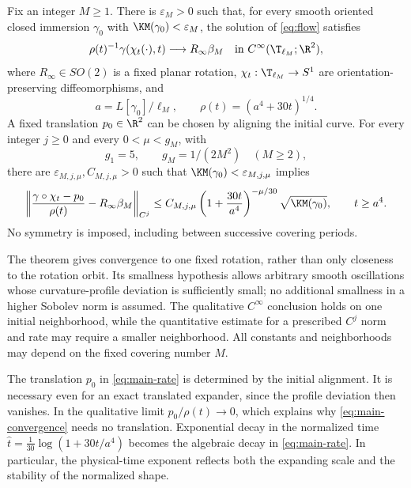 \begin{theorem}\label{thm:main}
Fix an integer $M\ge1$. There is $\varepsilon_M>0$ such that, for every smooth oriented closed immersion $\gamma_0$ with $\KM(\gamma_0)<\varepsilon_M$, the solution of \eqref{eq:flow} satisfies
\begin{equation}\label{eq:main-convergence}
 \rho(t)^{-1}\gamma(\chi_t(\cdot),t)\longrightarrow R_\infty\beta_M
 \quad\text{in }C^\infty(\T_{\ell_M};\R^2),
\end{equation}
where $R_\infty\in SO(2)$ is a fixed planar rotation, $\chi_t:\T_{\ell_M}\to S^1$ are orientation-preserving diffeomorphisms, and
\begin{equation}\label{eq:rho-intro}
 a=L[\gamma_0]/\ell_M,\qquad \rho(t)=(a^4+30t)^{1/4}.
\end{equation}
A fixed translation $p_0\in\R^2$ can be chosen by aligning the initial curve. For every integer $j\ge0$ and every $0<\mu<g_M$, with
\begin{equation}\label{eq:certified-gaps}
 g_1=5,\qquad g_M=1/(2M^2)\quad(M\ge2),
\end{equation}
there are $\varepsilon_{M,j,\mu},C_{M,j,\mu}>0$ such that $\KM(\gamma_0)<\varepsilon_{M,j,\mu}$ implies
\begin{equation}\label{eq:main-rate}
 \left\|\frac{\gamma\circ\chi_t-p_0}{\rho(t)}-R_\infty\beta_M\right\|_{C^j}
 \le C_{M,j,\mu}\left(1+\frac{30t}{a^4}\right)^{-\mu/30}
       \sqrt{\KM(\gamma_0)},\qquad t\ge a^4.
\end{equation}
No symmetry is imposed, including between successive covering periods.
\end{theorem}

The theorem gives convergence to one fixed rotation, rather than only closeness to the rotation orbit. Its smallness hypothesis allows arbitrary smooth oscillations whose curvature-profile deviation is sufficiently small; no additional smallness in a higher Sobolev norm is assumed. The qualitative $C^\infty$ conclusion holds on one initial neighborhood, while the quantitative estimate for a prescribed $C^j$ norm and rate may require a smaller neighborhood. All constants and neighborhoods may depend on the fixed covering number $M$.

The translation $p_0$ in \eqref{eq:main-rate} is determined by the initial alignment. It is necessary even for an exact translated expander, since the profile deviation then vanishes. In the qualitative limit $p_0/\rho(t)\to0$, which explains why \eqref{eq:main-convergence} needs no translation. Exponential decay in the normalized time $\widehat t=\frac1{30}\log(1+30t/a^4)$ becomes the algebraic decay in \eqref{eq:main-rate}. In particular, the physical-time exponent reflects both the expanding scale and the stability of the normalized shape.

